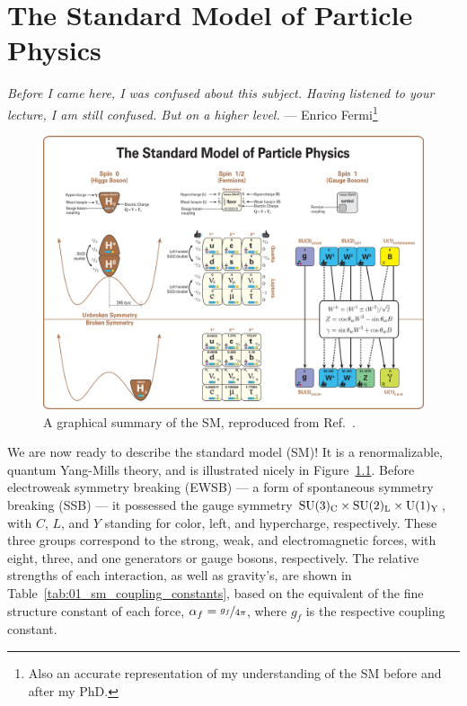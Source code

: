 
\chapter{The Standard Model of Particle Physics}
\label{sec:01_sm}

\begin{center}
	\centering
	\noindent
	\textit{Before I came here, I was confused about this subject. Having listened to your lecture, I am still confused. But on a higher level.} --- Enrico Fermi\footnote{Also an accurate representation of my understanding of the SM before and after my PhD.}
\end{center}


\begin{figure}
	\centering
	\captionsetup{justification=centering}
	\includegraphics[width=\textwidth]{figures/01-SM-03-SM/Standard_Model_Of_Particle_Physics--Most_Complete_Diagram.png}
	\caption{A graphical summary of the SM, reproduced from Ref.~\cite{SMMostCompleteDiagram}.}
	\label{fig:01_sm_summary}
\end{figure}

We are now ready to describe the standard model (SM)!
It is a renormalizable, quantum Yang-Mills theory, and is illustrated nicely in Figure~\ref{fig:01_sm_summary}.
Before electroweak symmetry breaking (EWSB) --- a form of spontaneous symmetry breaking (SSB) --- it possessed the gauge symmetry $\SU[3]_\mathrm{C} \times \SU[2]_\mathrm{L} \times \UU[1]_\mathrm{Y}$, with $C$, $L$, and $Y$ standing for color, left, and hypercharge, respectively.
These three groups correspond to the strong, weak, and electromagnetic forces, with eight, three, and one generators or gauge bosons, respectively.
The relative strengths of each interaction, as well as gravity's, are shown in Table~\ref{tab:01_sm_coupling_constants}, based on the equivalent of the fine structure constant of each force, $\alpha_f = \nicefrac{g_f}{4\pi}$, where $g_f$ is the respective coupling constant.

